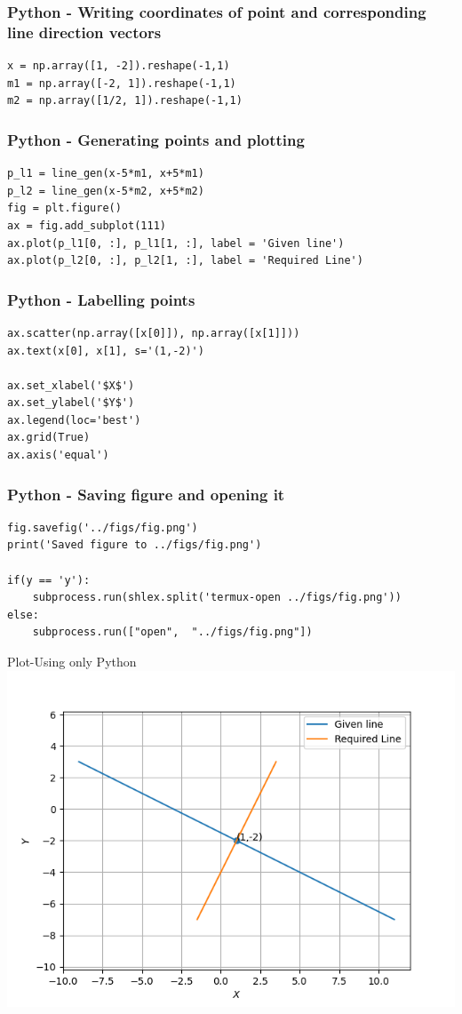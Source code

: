 \documentclass{beamer}
\begin{document}
\begin{frame}[fragile]
    \frametitle{Python - Writing coordinates of point and corresponding line direction vectors}
    \begin{lstlisting}
x = np.array([1, -2]).reshape(-1,1)
m1 = np.array([-2, 1]).reshape(-1,1)
m2 = np.array([1/2, 1]).reshape(-1,1)
\end{lstlisting}
\end{frame}

\begin{frame}[fragile]
    \frametitle{Python - Generating points and plotting}
    \begin{lstlisting}
p_l1 = line_gen(x-5*m1, x+5*m1)
p_l2 = line_gen(x-5*m2, x+5*m2)
fig = plt.figure()
ax = fig.add_subplot(111)
ax.plot(p_l1[0, :], p_l1[1, :], label = 'Given line')
ax.plot(p_l2[0, :], p_l2[1, :], label = 'Required Line')
\end{lstlisting}
\end{frame}

\begin{frame}[fragile]
    \frametitle{Python - Labelling points}
    \begin{lstlisting}
ax.scatter(np.array([x[0]]), np.array([x[1]]))
ax.text(x[0], x[1], s='(1,-2)')

ax.set_xlabel('$X$')
ax.set_ylabel('$Y$')
ax.legend(loc='best')
ax.grid(True) 
ax.axis('equal')
    \end{lstlisting}
\end{frame}

\begin{frame}[fragile]
    \frametitle{Python - Saving figure and opening it}
    \begin{lstlisting}
fig.savefig('../figs/fig.png')
print('Saved figure to ../figs/fig.png')

if(y == 'y'):
    subprocess.run(shlex.split('termux-open ../figs/fig.png'))
else:
    subprocess.run(["open",  "../figs/fig.png"])
    \end{lstlisting}
\end{frame}


\begin{frame}{Plot-Using only Python}
    \centering
    \includegraphics[width=\columnwidth, height=0.8\textheight, keepaspectratio]{../figs/fig.png}     
\end{frame}
\end{document}
